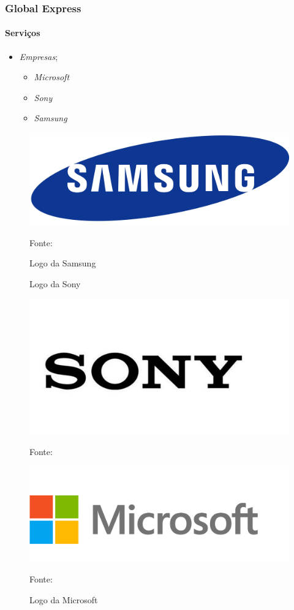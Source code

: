\documentclass[aspectratio=169]{beamer}
\begin{document}
	\begin{frame}
		\frametitle{Global Express}
		\framesubtitle{Serviços}
		
		\begin{minipage}[!h]{.3\textwidth}
			\begin{itemize}
				\item \textit{Empresas};
				\begin{itemize}
					\item \textit{Microsoft}
					\item \textit{Sony}
					\item \textit{Samsung}
				\end{itemize}
			\end{itemize}
		\end{minipage}
		\hfill
		\begin{minipage}[!h]{.3\textwidth}
			\begin{figure}
				\centering
				\caption{Logo da Samsung}
				
				\includegraphics[width=.50\linewidth]{logo_samsung.png}
				
				\footnotesize{Fonte: }
				\label{logsam}
			\end{figure} 	 
		\end{minipage}
		\hfill	
		\begin{minipage}[!h]{.3\textwidth}
			\begin{figure}
				\centering
				\caption{Logo da Sony}
				
				\includegraphics[width=.40\linewidth]{logo_sony.png}
				
				\footnotesize{Fonte: }
				\label{logsony}
				
				\centering
				\caption{Logo da Microsoft}
				
				\includegraphics[width=.40\linewidth]{logo_microsoft.png}
				
				\footnotesize{Fonte: }
				\label{logmicro}
			\end{figure} 	
		\end{minipage}
	\end{frame}
	
\end{document}
